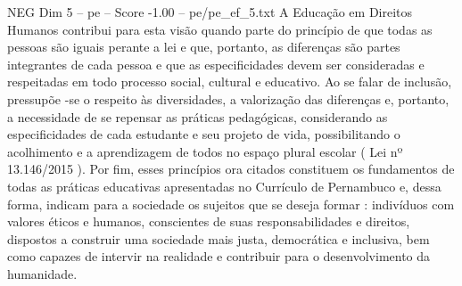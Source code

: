 \begin{textsample}{NEG Dim 5 – pe – Score -1.00 – pe/pe\_ef\_5.txt}
A Educação em Direitos Humanos contribui para esta visão quando parte do princípio de que todas as pessoas são iguais perante a lei e que, portanto, as diferenças são partes integrantes de cada pessoa e que as especificidades devem ser consideradas e respeitadas em todo processo social, cultural e educativo.
Ao se falar de inclusão, pressupõe -se o respeito às diversidades, a valorização das diferenças e, portanto, a necessidade de se repensar as práticas pedagógicas, considerando as especificidades de cada estudante e seu projeto de vida, possibilitando o acolhimento e a aprendizagem de todos no espaço plural escolar ( Lei nº 13.146/2015 ).
Por fim, esses princípios ora citados constituem os fundamentos de todas as práticas educativas apresentadas no Currículo de Pernambuco e, dessa forma, indicam para a sociedade os sujeitos que se deseja formar : indivíduos com valores éticos e humanos, conscientes de suas responsabilidades e direitos, dispostos a construir uma sociedade mais justa, democrática e inclusiva, bem como capazes de intervir na realidade e contribuir para o desenvolvimento da humanidade.

\end{textsample}
